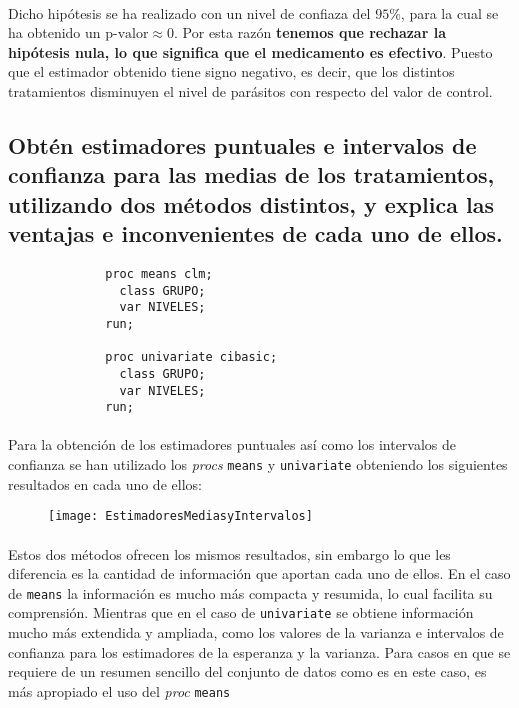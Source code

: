 \documentclass{article}
\begin{document}
      \paragraph{}
      Dicho hipótesis se ha realizado con un nivel de confiaza del $95\%$, para la cual se ha obtenido un $\text{p-valor}\approx 0$. Por esta razón \textbf{tenemos que rechazar la hipótesis nula, lo que significa que el medicamento es efectivo}. Puesto que el estimador obtenido tiene signo negativo, es decir, que los distintos tratamientos disminuyen el nivel de parásitos con respecto del valor de control.

    \subsection{Obtén estimadores puntuales e intervalos de confianza para las medias de los tratamientos, utilizando dos métodos distintos, y explica las ventajas e inconvenientes de cada uno de ellos.}

    \begin{figure}[h]
      \centering
      \begin{verbatim}
        proc means clm;
          class GRUPO;
          var NIVELES;
        run;

        proc univariate cibasic;
          class GRUPO;
          var NIVELES;
        run;
      \end{verbatim}
      \label{code:sas_4}
    \end{figure}

      \paragraph{}
      Para la obtención de los estimadores puntuales así como los intervalos de confianza se han utilizado los \emph{procs} \texttt{means} y \texttt{univariate} obteniendo los siguientes resultados en cada uno de ellos:


      \begin{figure}[H]
        \centering
        \texttt{[image: EstimadoresMediasyIntervalos]}
      \end{figure}

      \paragraph{}
      Estos dos métodos ofrecen los mismos resultados, sin embargo lo que les diferencia es la cantidad de información que aportan cada uno de ellos. En el caso de \texttt{means} la información es mucho más compacta y resumida, lo cual facilita su comprensión. Mientras que en el caso de \texttt{univariate} se obtiene información mucho más extendida y ampliada, como los valores de la varianza e intervalos de confianza para los estimadores de la esperanza y la varianza. Para casos en que se requiere de un resumen sencillo del conjunto de datos como es en este caso, es más apropiado el uso del \emph{proc} \texttt{means}
\end{document}
